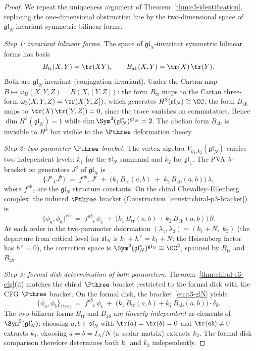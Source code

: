 \begin{proof}
We repeat the uniqueness argument of
Theorem~\ref{thm:e3-identification}, replacing the
one-dimensional obstruction line by the two-dimensional space of
$\mathfrak{gl}_N$-invariant symmetric bilinear forms.

\smallskip
\noindent\textit{Step 1: invariant bilinear forms.}
The space of $\mathfrak{gl}_N$-invariant symmetric
bilinear forms has basis
\[
 B_{\mathrm{tr}}(X,Y) = \tr(XY),
 \qquad
 B_{\mathrm{ab}}(X,Y) = \tr(X)\,\tr(Y).
\]
Both are $\mathfrak{gl}_N$-invariant (conjugation-invariant).
Under the Cartan map
$B \mapsto \omega_B(X,Y,Z) = B(X,[Y,Z])$:
the form $B_{\mathrm{tr}}$ maps to the Cartan three-form
$\omega_3(X,Y,Z) = \tr(X[Y,Z])$, which generates
$H^3(\mathfrak{sl}_N) \cong \CC$; the form
$B_{\mathrm{ab}}$ maps to
$\tr(X)\,\tr([Y,Z]) = 0$, since the trace vanishes on
commutators. Hence $\dim H^3(\mathfrak{gl}_N) = 1$
while $\dim \Sym^2(\mathfrak{gl}_N^*)^{\mathfrak{gl}_N} = 2$.
The abelian form $B_{\mathrm{ab}}$ is invisible to $H^3$
but visible to the $\Pthree$ deformation theory.

\smallskip
\noindent\textit{Step 2: two-parameter $\Pthree$ bracket.}
The vertex algebra
$V_{k_1, k_2}(\mathfrak{gl}_N)$ carries two independent
levels: $k_1$ for the $\mathfrak{sl}_N$ summand and
$k_2$ for $\mathfrak{gl}_1$. The PVA
$\lambda$-bracket on generators $J^a$ of
$\mathfrak{gl}_N$ is
\[
 \{J^a {}_\lambda J^b\}
 \;=\;
 f^{ab}{}_c\, J^c
 \;+\;
 \bigl(k_1\, B_{\mathrm{tr}}(a,b)
 \;+\;
 k_2\, B_{\mathrm{ab}}(a,b)\bigr)\,\lambda,
\]
where $f^{ab}{}_c$ are the $\mathfrak{gl}_N$ structure
constants. On the chiral Chevalley--Eilenberg complex, the
induced $\Pthree$ bracket
(Construction~\ref{constr:chiral-p3-bracket}) is
\begin{equation}\label{eq:p3-glN}
 \{\phi_a, \phi_b\}^{\mathrm{ch}}
 \;=\;
 f^{ab}{}_c\,\phi_c
 \;+\;
 \bigl(k_1\, B_{\mathrm{tr}}(a,b)
 + k_2\, B_{\mathrm{ab}}(a,b)\bigr)\,\partial.
\end{equation}
At each order in the two-parameter deformation
$(\lambda_1, \lambda_2) =
(k_1 + N,\; k_2)$
(the departure from critical level for $\mathfrak{sl}_N$
is $k_1 + h^\vee = k_1 + N$; the Heisenberg factor has
$h^\vee = 0$), the correction space is
$\Sym^2(\mathfrak{gl}_N^*)^{\mathfrak{gl}_N}
\cong \CC^2$, spanned by $B_{\mathrm{tr}}$ and
$B_{\mathrm{ab}}$.

\smallskip
\noindent\textit{Step 3: formal disk determination of both
parameters.}
Theorem~\ref{thm:chiral-e3-cfg}(ii) matches the chiral
$\Pthree$ bracket restricted to the formal disk with the
CFG $\Pthree$ bracket. On the formal disk, the
bracket~\eqref{eq:p3-glN} yields
\[
 \{\phi_a, \phi_b\}_{\mathrm{CFG}}
 \;=\;
 f^{ab}{}_c\,\phi_c
 \;+\;
 \bigl(k_1\, B_{\mathrm{tr}}(a,b)
 + k_2\, B_{\mathrm{ab}}(a,b)\bigr) \cdot \delta_0.
\]
The two bilinear forms $B_{\mathrm{tr}}$ and
$B_{\mathrm{ab}}$ are \emph{linearly independent} as
elements of $\Sym^2(\mathfrak{gl}_N^*)$: choosing
$a,b \in \mathfrak{sl}_N$ with $\tr(a) = \tr(b) = 0$ and
$\tr(ab) \neq 0$ extracts $k_1$; choosing
$a = b = I_N/N$ (a scalar matrix) extracts $k_2$.
The formal disk comparison therefore determines
both $k_1$ and $k_2$ independently.


\end{proof}
